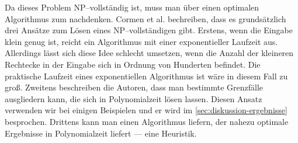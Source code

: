 Da dieses Problem NP--vollständig ist, muss man über einen optimalen Algorithmus zum
\fp{} nachdenken. 
Cormen et al. bechreiben, dass es grundsätzlich drei Ansätze zum Lösen eines
NP--vollständigen gibt.\cite[S.~1106]{cormen}
Erstens, wenn die Eingabe klein genug ist, reicht ein 
Algorithmus mit einer exponentieller Laufzeit aus.
Allerdings lässt sich diese Idee schlecht umsetzen,
wenn die Anzahl der kleineren Rechtecke in der Eingabe sich in Ordnung von Hunderten befindet.
Die praktische Laufzeit eines exponentiellen Algorithmus ist wäre in diesem Fall zu groß.
Zweitens beschreiben die Autoren,
dass man bestimmte Grenzfälle ausgliedern kann, die sich in Polynomialzeit lösen lassen.
Diesen Ansatz verwenden wir bei einigen Beispielen und er wird im \cref{sec:diskussion-ergebnisse}
besprochen.
Drittens kann man einen Algorithmus liefern, der nahezu optimale Ergebnisse 
in Polynomialzeit liefert --- eine Heuristik.



